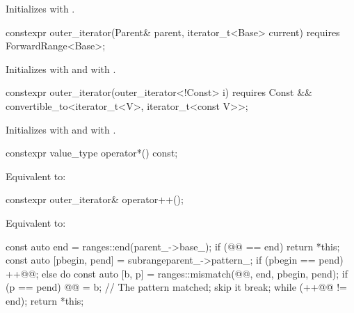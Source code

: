 \begin{itemdescr}
\pnum
\effects Initializes  with .
\end{itemdescr}

%
\begin{itemdecl}
constexpr outer_iterator(Parent& parent, iterator_t<Base> current)
  requires ForwardRange<Base>;
\end{itemdecl}

\begin{itemdescr}
\pnum
\effects Initializes  with 
and  with .
\end{itemdescr}

%
\begin{itemdecl}
constexpr outer_iterator(outer_iterator<!Const> i)
  requires Const && convertible_to<iterator_t<V>, iterator_t<const V>>;
\end{itemdecl}

\begin{itemdescr}
\pnum
\effects Initializes  with  and
 with .
\end{itemdescr}

%
\begin{itemdecl}
constexpr value_type operator*() const;
\end{itemdecl}

\begin{itemdescr}
\pnum
\effects Equivalent to: 
\end{itemdescr}

%
\begin{itemdecl}
constexpr outer_iterator& operator++();
\end{itemdecl}

\begin{itemdescr}
\pnum
\effects Equivalent to:
\begin{codeblock}
const auto end = ranges::end(parent_->base_);
if (@@ == end) return *this;
const auto [pbegin, pend] = subrange{parent_->pattern_};
if (pbegin == pend) ++@@;
else {
  do {
    const auto [b, p] = ranges::mismatch(@@, end, pbegin, pend);
    if (p == pend) {
      @@ = b;  // The pattern matched; skip it
      break;
    }
  } while (++@@ != end);
}
return *this;
\end{codeblock}
\end{itemdescr}

